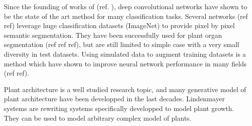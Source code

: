 %

Since the founding of works of (ref. ), deep convolutional networks have shown
to be the state of the art method for many classification tasks. Several
networks (ref ref) leverage huge classification datasets (ImageNet) to provide pixel by
pixel semantic segmentation. They have been successfully used for plant organ
segmentation (ref ref ref), but are still limited to simple case with a very
small diversity in test datasets. Using simulated data to augment training
datasets is a method which have shown to improve neural network performance in
many fields (ref ref).

Plant architecture is a well studied research topic, and many generative model
of plant architecture have been developped in the last decades. Lindenmayer
systems are rewriting systems specifically developped to model plant growth.
They can be used to model arbitrary complex model of plants.


